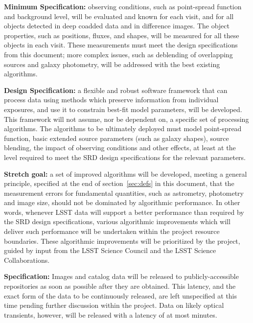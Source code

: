 {\bf Minimum Specification:} observing conditions, such as point-spread function and
background level, will be evaluated and known for each visit, and for all objects
detected in deep coadded data and in difference images. The object properties,
such as positions, fluxes, and shapes, will be measured for all these objects in
each visit. These measurements must meet the design specifications from this
document; more complex issues, such as deblending of overlapping sources
and galaxy photometry, will be addressed with the best existing algorithms.

{\bf Design Specification:} a flexible and robust software framework that can process
data using methods which preserve information from individual exposures, and
use it to constrain best-fit model parameters, will be developed.
This framework will not assume, nor be dependent on, a specific
set of processing algorithms. The algorithms to be ultimately deployed must model
point-spread function, basic extended source parameters (such as galaxy shapes),
source blending, the impact of observing conditions and other effects, at least at
the level required to meet the SRD design specifications for the relevant parameters.

{\bf Stretch goal:} a set of improved algorithms will be developed, meeting a general principle,
specified at the end of section~\ref{sec:defs} in this document, that the measurement errors for
fundamental quantities, such as astrometry, photometry and image size, should not be dominated
by algorithmic performance. In other words, whenever LSST data
will support a better performance than required by the SRD design specifications,
various algorithmic improvements which will deliver such performance will be
undertaken within the project resource boundaries. These algorithmic improvements
will be prioritized by the project, guided by input from the
LSST Science Council and the LSST Science Collaborations.

{\bf Specification:} Images and catalog data will be released to
publicly-accessible repositories as soon as possible after they are
obtained. This latency, and the exact form of the data to be continuously
released, are left unspecified at this time pending further discussion
within the project. Data on likely optical transients, however, will be
released with a latency of at most
minutes.

